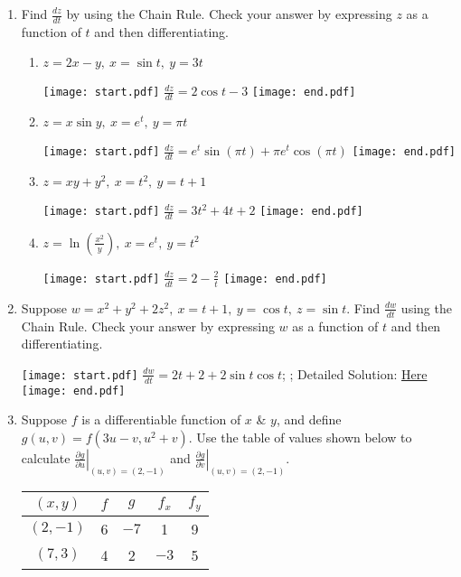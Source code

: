 \documentclass[12pt]{article}
\begin{document}
\begin{enumerate}

\item Find $\frac{d z}{d t}$ by using the Chain Rule.  Check your answer by expressing $z$ as a function of $t$ and then differentiating. 
 
\begin{enumerate}

\item $z=2x-y,\ x=\sin{t},\ y=3t$ 

\texttt{[image: start.pdf]}
{{$\frac{dz}{dt}=2\cos{t}-3$}}
\texttt{[image: end.pdf]}


\item $z=x\sin{y},\ x=e^t,\ y=\pi t$ 

\texttt{[image: start.pdf]}
{{$\frac{dz}{dt}=e^{t}\sin{(\pi t)}+\pi e^{t}\cos{(\pi t)}$}}
\texttt{[image: end.pdf]}


\item $z=xy+y^2,\ x=t^2,\ y=t+1$ 

\texttt{[image: start.pdf]}
{{$\frac{dz}{dt}=3t^2+4t+2$}}
\texttt{[image: end.pdf]}


\item $z=\ln{\left(\frac{x^2}{y}\right)},\ x=e^{t},\ y=t^2$ 

\texttt{[image: start.pdf]}
{{$\frac{dz}{dt}=2-\frac{2}{t}$}}
\texttt{[image: end.pdf]}


\end{enumerate}

\item  Suppose $w=x^2+y^2+2z^2,\ x=t+1,\ y=\cos{t},\ z=\sin{t}$.   Find $\frac{d w}{d t}$ using the Chain Rule.  Check your answer by expressing $w$ as a function of $t$ and then differentiating.

\texttt{[image: start.pdf]}
{{$\frac{dw}{dt}=2t+2+2\sin{t}\cos{t}$; ; Detailed Solution: \textcolor{blue}{\href{http://www.math.drexel.edu/classes/Calculus/resources/Math200HW/Solutions/11_200_Chain_02.pdf}{Here}} }}
\texttt{[image: end.pdf]}


\item Suppose $f$ is a differentiable function of $x$ \& $y$, and define $g(u,v)=f(3u-v,u^2+v)$.  Use the table of values shown below to calculate $\left.\frac{\partial g}{\partial u}\right|_{(u,v)=(2,-1)}$ and $\left.\frac{\partial g}{\partial v}\right|_{(u,v)=(2,-1)}$.

\begin{center}
\begin{tabular}{|c|c|c|c|c|}
\hline
$(x,y)$& $f$ & $g$ & $f_x$ & $f_y$\\
\hline
$(2,-1)$ & 6 & $-7$ & 1 & 9\\
\hline
$(7,3)$ & 4 & 2 & $-3$ & 5\\
\hline
\end{tabular}
\end{center}


\end{enumerate}
\end{document}
